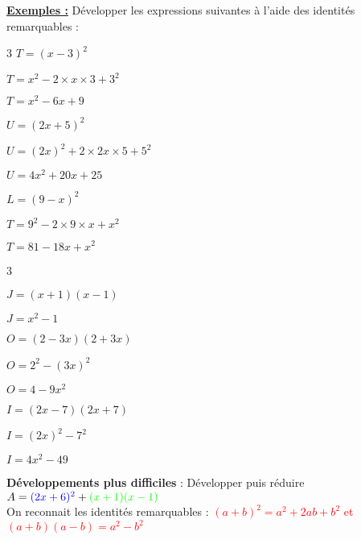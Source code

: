 \documentclass[a4paper,10pt,twoside,french]{article}
\newcommand{\bmul}[1]{\begin{multicols}{#1}}
\newcommand{\emul}{\end{multicols}}
\begin{document}
 \vspace*{0.5cm}
 

 

\textbf{\underline{Exemples :}} Développer les expressions suivantes à l'aide des identités remarquables : \\

   \color{red}
   
   \bmul{3} 
    $T = (x-3)^{2} $
    
   $T = x^{2} - 2 \times x \times 3 + 3^{2}$
   
     $T = x^{2} - 6x + 9$
     
     
     \columnbreak
      $U= (2x + 5)^{2} $
      
       $U = (2x)^{2} + 2 \times 2x \times 5 + 5^{2}$
   
      
          $U = 4x^{2} +20x + 25$
     
     \columnbreak
     $L=(9 - x)^{2}$
     
     $T = 9^{2} - 2 \times 9 \times x + x^{2}$
   
     $T = 81 - 18x + x^{2}$
     
     \emul
   
   \color{black}
   
   

   \color{red}
   
   \bmul{3} 
   
   $J=(x+1)(x-1) $
   
   $J=x^{2}-1$
   
   \columnbreak
   
   $O=(2-3x)(2+3x) $ 
   
   $O=2^{2}-(3x)^{2}$
   
    $O=4-9x^{2}$
   
   \columnbreak
   
   $I=(2x-7)(2x+7) $
   
    $I=(2x)^{2}-7^{2}$
   
    $I=4x^{2}-49$
    
   \emul


   \color{black}
  
  \vspace*{0.5cm}

\textbf{Développements plus difficiles} : Développer puis réduire $A = \textcolor{blue}{( 2 x + 6 ) ^{2}} + \textcolor{green}{( x + 1 ) ( x - 1 )}$\\

On reconnait les identités remarquables : \textcolor{red}{$(a+b)^{2} = a^{2} + 2ab + b^{2}$ \hspace*{1cm} et \hspace*{1cm} $(a+b)(a-b) = a^{2} - b^{2}$}\\
\end{document}
